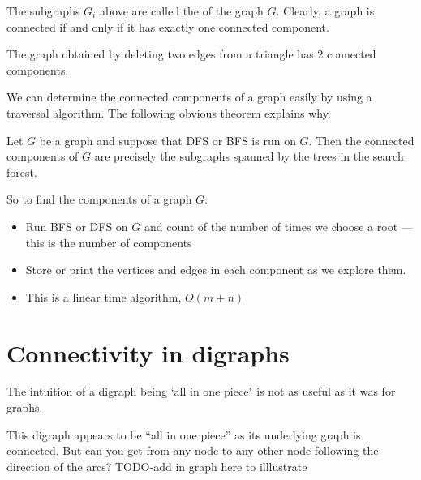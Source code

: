 The subgraphs $G_i$ above are called the 
of the graph $G$. Clearly, a graph is connected if and only if it has
exactly one connected component.

\begin{Example}
\label{eg:components}
The graph obtained by deleting two edges from a triangle has 2 connected 
components.
\end{Example}

We can determine the connected components of a graph easily by using a
traversal algorithm. The following obvious theorem explains why.

\begin{Theorem}
\label{thm:trav-comps}
Let $G$ be a graph and suppose that DFS or BFS is run on $G$. Then the
connected components of $G$ are precisely the subgraphs spanned by the
trees in the search forest. 
\end{Theorem}


So to find the components of a graph $G$:
\begin{itemize}
\item Run BFS or DFS on $G$ and count
of the number of times we choose a root --- this is the number of components
\item Store or print the vertices and edges in each
component as we explore them.
\item This is a linear time algorithm, $O(m+n)$
\end{itemize}

\section{Connectivity in digraphs}

The intuition of a digraph being `all 
in one piece" is not as useful as it was for graphs. 

\begin{Boxample}[0]
This digraph appears to be ``all in one piece'' as its underlying graph is connected. But can you get from any node to any other node following the direction of the arcs? 
TODO-add in graph here to illlustrate
\end{Boxample}

